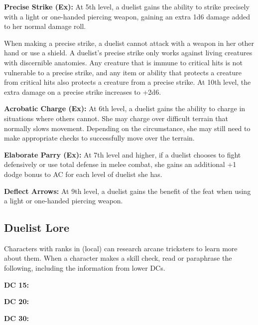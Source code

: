 \textbf{Precise Strike (Ex):} At 5th level, a duelist gains the ability to strike precisely with a light or one-handed piercing weapon, gaining an extra 1d6 damage added to her normal damage roll.

When making a precise strike, a duelist cannot attack with a weapon in her other hand or use a shield. A duelist’s precise strike only works against living creatures with discernible anatomies. Any creature that is immune to critical hits is not vulnerable to a precise strike, and any item or ability that protects a creature from critical hits also protects a creature from a precise strike. At 10th level, the extra damage on a precise strike increases to +2d6.

\textbf{Acrobatic Charge (Ex):} At 6th level, a duelist gains the ability to charge in situations where others cannot. She may charge over difficult terrain that normally slows movement. Depending on the circumstance, she may still need to make appropriate checks to successfully move over the terrain.

\textbf{Elaborate Parry (Ex):} At 7th level and higher, if a duelist chooses to fight defensively or use total defense in melee combat, she gains an additional +1 dodge bonus to AC for each level of duelist she has.

\textbf{Deflect Arrows:} At 9th level, a duelist gains the benefit of the  feat when using a light or one-handed piercing weapon.

\subsection{Duelist Lore}
Characters with ranks in  (local) can research arcane tricksters to learn more about them. When a character makes a skill check, read or paraphrase the following, including the information from lower DCs.

\textbf{DC 15:}

\textbf{DC 20:}

\textbf{DC 30:}
